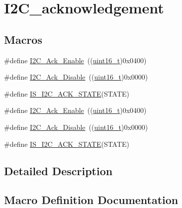 \hypertarget{group___i2_c__acknowledgement}{}\section{I2\+C\+\_\+acknowledgement}
\label{group___i2_c__acknowledgement}
\subsection*{Macros}
\begin{DoxyCompactItemize}
\item 
\#define \hyperlink{group___i2_c__acknowledgement_ga616466f8ef5a47237cdbf7ac578ec507}{I2\+C\+\_\+\+Ack\+\_\+\+Enable}~((\hyperlink{_p_e___types_8h_a1f1825b69244eb3ad2c7165ddc99c956}{uint16\+\_\+t})0x0400)
\item 
\#define \hyperlink{group___i2_c__acknowledgement_gadb5f47c052ac6bae1aa58c724e339e36}{I2\+C\+\_\+\+Ack\+\_\+\+Disable}~((\hyperlink{_p_e___types_8h_a1f1825b69244eb3ad2c7165ddc99c956}{uint16\+\_\+t})0x0000)
\item 
\#define \hyperlink{group___i2_c__acknowledgement_ga6401bedc842e784a2bb78b3aa21af19d}{I\+S\+\_\+\+I2\+C\+\_\+\+A\+C\+K\+\_\+\+S\+T\+A\+TE}(S\+T\+A\+TE)
\item 
\#define \hyperlink{group___i2_c__acknowledgement_ga616466f8ef5a47237cdbf7ac578ec507}{I2\+C\+\_\+\+Ack\+\_\+\+Enable}~((\hyperlink{_p_e___types_8h_a1f1825b69244eb3ad2c7165ddc99c956}{uint16\+\_\+t})0x0400)
\item 
\#define \hyperlink{group___i2_c__acknowledgement_gadb5f47c052ac6bae1aa58c724e339e36}{I2\+C\+\_\+\+Ack\+\_\+\+Disable}~((\hyperlink{_p_e___types_8h_a1f1825b69244eb3ad2c7165ddc99c956}{uint16\+\_\+t})0x0000)
\item 
\#define \hyperlink{group___i2_c__acknowledgement_ga6401bedc842e784a2bb78b3aa21af19d}{I\+S\+\_\+\+I2\+C\+\_\+\+A\+C\+K\+\_\+\+S\+T\+A\+TE}(S\+T\+A\+TE)
\end{DoxyCompactItemize}


\subsection{Detailed Description}


\subsection{Macro Definition Documentation}
